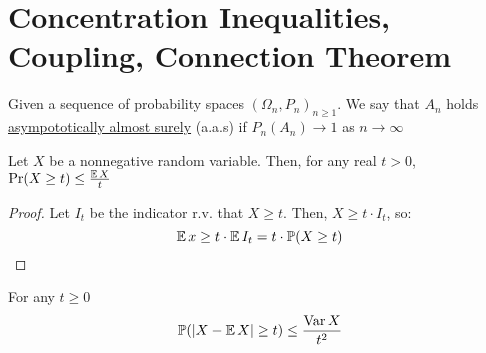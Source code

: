 \section{Concentration Inequalities, Coupling, Connection Theorem}

\begin{definition}
    Given a sequence of probability spaces $(\Omega_n, P_n)_{n \geq 1}$. We say that $A_n$ holds \ul{asympototically almost surely} (a.a.s) if $P_n(A_n) \rightarrow 1$ as $n \rightarrow \infty$
\end{definition}

\begin{theorem}
    Let $X$ be a nonnegative random variable. Then, for any real $t > 0$, $\Pr(X \geq t) \leq \frac{\operatorname{\mathbb{E}} X}{t}$
\end{theorem}
\begin{proof}
    Let $I_t$ be the indicator r.v. that $X \geq t$.
    Then, $X \geq t\cdot I_t$, so:
    \begin{equation*}
        \operatorname{\mathbb{E}} x \geq t \cdot \operatorname{\mathbb{E}} I_t = t \cdot \operatorname{\mathbb{P}} (X \geq t)
    \end{equation*}
\end{proof}

\begin{theorem}
    For any $t \geq 0$
    \begin{equation*}
        \operatorname{\mathbb{P}} (| X - \operatorname{\mathbb{E}} X | \geq t) \leq \frac{\operatorname{\mathrm{Var}} X}{t^2}
    \end{equation*}
\end{theorem}
